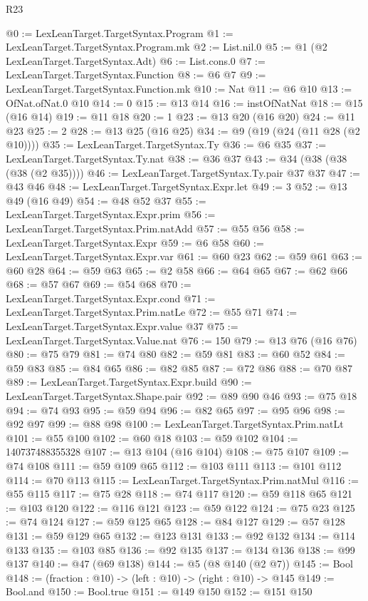 \begin{lexlean}{R23}
\begin{coremodule}
@0 := LexLeanTarget.TargetSyntax.Program
@1 := LexLeanTarget.TargetSyntax.Program.mk
@2 := List.nil.{0}
@5 := @1 (@2 LexLeanTarget.TargetSyntax.Adt)
@6 := List.cons.{0}
@7 := LexLeanTarget.TargetSyntax.Function
@8 := @6 @7
@9 := LexLeanTarget.TargetSyntax.Function.mk
@10 := Nat
@11 := @6 @10
@13 := OfNat.ofNat.{0} @10
@14 := 0
@15 := @13 @14
@16 := instOfNatNat
@18 := @15 (@16 @14)
@19 := @11 @18
@20 := 1
@23 := @13 @20 (@16 @20)
@24 := @11 @23
@25 := 2
@28 := @13 @25 (@16 @25)
@34 := @9 (@19 (@24 (@11 @28 (@2 @10))))
@35 := LexLeanTarget.TargetSyntax.Ty
@36 := @6 @35
@37 := LexLeanTarget.TargetSyntax.Ty.nat
@38 := @36 @37
@43 := @34 (@38 (@38 (@38 (@2 @35))))
@46 := LexLeanTarget.TargetSyntax.Ty.pair @37 @37
@47 := @43 @46
@48 := LexLeanTarget.TargetSyntax.Expr.let
@49 := 3
@52 := @13 @49 (@16 @49)
@54 := @48 @52 @37
@55 := LexLeanTarget.TargetSyntax.Expr.prim
@56 := LexLeanTarget.TargetSyntax.Prim.natAdd
@57 := @55 @56
@58 := LexLeanTarget.TargetSyntax.Expr
@59 := @6 @58
@60 := LexLeanTarget.TargetSyntax.Expr.var
@61 := @60 @23
@62 := @59 @61
@63 := @60 @28
@64 := @59 @63
@65 := @2 @58
@66 := @64 @65
@67 := @62 @66
@68 := @57 @67
@69 := @54 @68
@70 := LexLeanTarget.TargetSyntax.Expr.cond
@71 := LexLeanTarget.TargetSyntax.Prim.natLe
@72 := @55 @71
@74 := LexLeanTarget.TargetSyntax.Expr.value @37
@75 := LexLeanTarget.TargetSyntax.Value.nat
@76 := 150
@79 := @13 @76 (@16 @76)
@80 := @75 @79
@81 := @74 @80
@82 := @59 @81
@83 := @60 @52
@84 := @59 @83
@85 := @84 @65
@86 := @82 @85
@87 := @72 @86
@88 := @70 @87
@89 := LexLeanTarget.TargetSyntax.Expr.build
@90 := LexLeanTarget.TargetSyntax.Shape.pair
@92 := @89 @90 @46
@93 := @75 @18
@94 := @74 @93
@95 := @59 @94
@96 := @82 @65
@97 := @95 @96
@98 := @92 @97
@99 := @88 @98
@100 := LexLeanTarget.TargetSyntax.Prim.natLt
@101 := @55 @100
@102 := @60 @18
@103 := @59 @102
@104 := 140737488355328
@107 := @13 @104 (@16 @104)
@108 := @75 @107
@109 := @74 @108
@111 := @59 @109 @65
@112 := @103 @111
@113 := @101 @112
@114 := @70 @113
@115 := LexLeanTarget.TargetSyntax.Prim.natMul
@116 := @55 @115
@117 := @75 @28
@118 := @74 @117
@120 := @59 @118 @65
@121 := @103 @120
@122 := @116 @121
@123 := @59 @122
@124 := @75 @23
@125 := @74 @124
@127 := @59 @125 @65
@128 := @84 @127
@129 := @57 @128
@131 := @59 @129 @65
@132 := @123 @131
@133 := @92 @132
@134 := @114 @133
@135 := @103 @85
@136 := @92 @135
@137 := @134 @136
@138 := @99 @137
@140 := @47 (@69 @138)
@144 := @5 (@8 @140 (@2 @7))
@145 := Bool
@148 := (fraction : @10) -> (left : @10) -> (right : @10) -> @145
@149 := Bool.and
@150 := Bool.true
@151 := @149 @150
@152 := @151 @150

\end{coremodule}
\end{lexlean}
